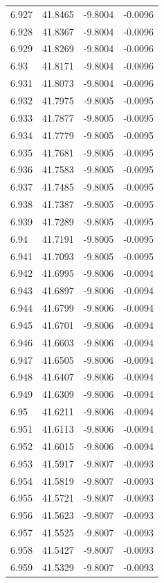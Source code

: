 \begin{tabular}{llll}
6.927 & 41.8465 & -9.8004 & -0.0096 \\
6.928 & 41.8367 & -9.8004 & -0.0096 \\
6.929 & 41.8269 & -9.8004 & -0.0096 \\
6.93 & 41.8171 & -9.8004 & -0.0096 \\
6.931 & 41.8073 & -9.8004 & -0.0096 \\
6.932 & 41.7975 & -9.8005 & -0.0095 \\
6.933 & 41.7877 & -9.8005 & -0.0095 \\
6.934 & 41.7779 & -9.8005 & -0.0095 \\
6.935 & 41.7681 & -9.8005 & -0.0095 \\
6.936 & 41.7583 & -9.8005 & -0.0095 \\
6.937 & 41.7485 & -9.8005 & -0.0095 \\
6.938 & 41.7387 & -9.8005 & -0.0095 \\
6.939 & 41.7289 & -9.8005 & -0.0095 \\
6.94 & 41.7191 & -9.8005 & -0.0095 \\
6.941 & 41.7093 & -9.8005 & -0.0095 \\
6.942 & 41.6995 & -9.8006 & -0.0094 \\
6.943 & 41.6897 & -9.8006 & -0.0094 \\
6.944 & 41.6799 & -9.8006 & -0.0094 \\
6.945 & 41.6701 & -9.8006 & -0.0094 \\
6.946 & 41.6603 & -9.8006 & -0.0094 \\
6.947 & 41.6505 & -9.8006 & -0.0094 \\
6.948 & 41.6407 & -9.8006 & -0.0094 \\
6.949 & 41.6309 & -9.8006 & -0.0094 \\
6.95 & 41.6211 & -9.8006 & -0.0094 \\
6.951 & 41.6113 & -9.8006 & -0.0094 \\
6.952 & 41.6015 & -9.8006 & -0.0094 \\
6.953 & 41.5917 & -9.8007 & -0.0093 \\
6.954 & 41.5819 & -9.8007 & -0.0093 \\
6.955 & 41.5721 & -9.8007 & -0.0093 \\
6.956 & 41.5623 & -9.8007 & -0.0093 \\
6.957 & 41.5525 & -9.8007 & -0.0093 \\
6.958 & 41.5427 & -9.8007 & -0.0093 \\
6.959 & 41.5329 & -9.8007 & -0.0093 \\

\end{tabular}
